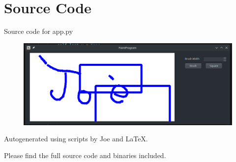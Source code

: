 \documentclass[12pt]{article}
\begin{document}
\maketitle
\pagebreak


\section{Source Code}

Source code for \textsf{app.py}


% 

\newpage

\begin{figure}[H]
  \centering
  \includegraphics[width=15cm]{ex1.png}
\end{figure}


\newpage

Autogenerated using scripts by Joe and \LaTeX.

Please find the full source code and binaries included.
\end{document}
